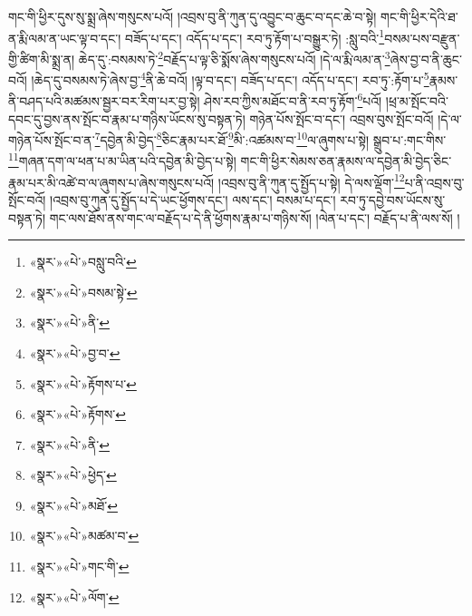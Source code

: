 གང་གི་ཕྱིར་དུས་སུ་སྨྲ་ཞེས་གསུངས་པའོ། །འབྲས་བུ་ནི་ཀུན་དུ་འབྱུང་བ་ཆུང་བ་དང་ཆེ་བ་སྟེ། གང་གི་ཕྱིར་དེའི་ཐ་ན་རྨི་ལམ་ན་ཡང་ལྟ་བ་དང་། བཟོད་པ་དང་། འདོད་པ་དང་། རབ་ཏུ་རྟོག་པ་བསྒྱུར་ཏེ། :སླུ་བའི་\footnote{«སྣར་»«པེ་»བསླུ་བའི་}བསམ་པས་བརྫུན་གྱི་ཚིག་མི་སྨྲ་ན། ཆེད་དུ་:བསམས་ཏེ་\footnote{«སྣར་»«པེ་»བསམ་སྟེ་}བརྗོད་པ་ལྟ་ཅི་སྨོས་ཞེས་གསུངས་པའོ། །དེ་ལ་རྨི་ལམ་ན་\footnote{«སྣར་»«པེ་»ནི་}ཞེས་བྱ་བ་ནི་ཆུང་བའོ། །ཆེད་དུ་བསམས་ཏེ་ཞེས་བྱ་\footnote{«སྣར་»«པེ་»བྱ་བ་}ནི་ཆེ་བའོ། །ལྟ་བ་དང་། བཟོད་པ་དང་། འདོད་པ་དང་། རབ་ཏུ་:རྟོག་པ་\footnote{«སྣར་»«པེ་»རྟོགས་པ་}རྣམས་ནི་བཤད་པའི་མཚམས་སྦྱར་བར་རིག་པར་བྱ་སྟེ། ཤེས་རབ་ཀྱིས་མཐོང་བ་ནི་རབ་ཏུ་རྟོག་\footnote{«སྣར་»«པེ་»རྟོགས་}པའོ། །ཕྲ་མ་སྤོང་བའི་དབང་དུ་བྱས་ནས་སྤོང་བ་རྣམ་པ་གཉིས་ཡོངས་སུ་བསྟན་ཏེ། གཉེན་པོས་སྤོང་བ་དང་། འབྲས་བུས་སྤོང་བའོ། །དེ་ལ་གཉེན་པོས་སྤོང་བ་ན་\footnote{«སྣར་»«པེ་»ནི་}དབྱེན་མི་བྱེད་\footnote{«སྣར་»«པེ་»ཕྱེད་}ཅིང་རྣམ་པར་ཐོ་\footnote{«སྣར་»«པེ་»མཐོ་}མི་:འཚམས་བ་\footnote{«སྣར་»«པེ་»མཚམ་བ་}ལ་ཞུགས་པ་སྟེ། སྒྲུབ་པ་:གང་གིས་\footnote{«སྣར་»«པེ་»གང་གི་}གཞན་དག་ལ་ཕན་པ་མ་ཡིན་པའི་དབྱེན་མི་བྱེད་པ་སྟེ། གང་གི་ཕྱིར་སེམས་ཅན་རྣམས་ལ་དབྱེན་མི་བྱེད་ཅིང་རྣམ་པར་མི་འཚེ་བ་ལ་ཞུགས་པ་ཞེས་གསུངས་པའོ། །འབྲས་བུ་ནི་ཀུན་དུ་སྤྱོད་པ་སྟེ། དེ་ལས་ལྡོག་\footnote{«སྣར་»«པེ་»ལོག་}པ་ནི་འབྲས་བུ་སྤོང་བའོ། །འབྲས་བུ་ཀུན་དུ་སྤྱོད་པ་དེ་ཡང་ཕྱོགས་དང་། ལས་དང་། བསམ་པ་དང་། རབ་ཏུ་དབྱེ་བས་ཡོངས་སུ་བསྟན་ཏེ། གང་ལས་ཐོས་ནས་གང་ལ་བརྗོད་པ་དེ་ནི་ཕྱོགས་རྣམ་པ་གཉིས་སོ། །ལེན་པ་དང་། བརྗོད་པ་ནི་ལས་སོ། །
